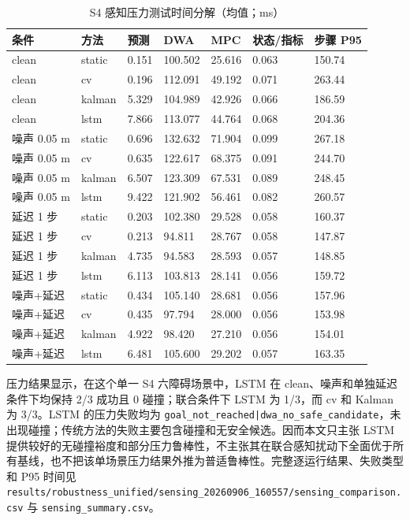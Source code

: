 \documentclass[10pt,a4paper,twocolumn]{ctexart}
\begin{document}
\begin{table}[t]
\centering
\small
\caption{S4 感知压力测试时间分解（均值；ms）}
\label{tab:table-8}
\begin{tabularx}{\textwidth}{YYYYYYY}
\toprule
条件 & 方法 & 预测 & DWA & MPC & 状态/指标 & 步骤 P95 \\
\midrule
clean & static & 0.151 & 100.502 & 25.616 & 0.063 & 150.74 \\
clean & cv & 0.196 & 112.091 & 49.192 & 0.071 & 263.44 \\
clean & kalman & 5.329 & 104.989 & 42.926 & 0.066 & 186.59 \\
clean & lstm & 7.866 & 113.077 & 44.764 & 0.068 & 204.36 \\
噪声 0.05 m & static & 0.696 & 132.632 & 71.904 & 0.099 & 267.18 \\
噪声 0.05 m & cv & 0.635 & 122.617 & 68.375 & 0.091 & 244.70 \\
噪声 0.05 m & kalman & 6.507 & 123.309 & 67.531 & 0.089 & 248.45 \\
噪声 0.05 m & lstm & 9.422 & 121.902 & 56.461 & 0.082 & 260.57 \\
延迟 1 步 & static & 0.203 & 102.380 & 29.528 & 0.058 & 160.37 \\
延迟 1 步 & cv & 0.213 & 94.811 & 28.767 & 0.058 & 147.87 \\
延迟 1 步 & kalman & 4.735 & 94.583 & 28.593 & 0.057 & 148.85 \\
延迟 1 步 & lstm & 6.113 & 103.813 & 28.141 & 0.056 & 159.72 \\
噪声+延迟 & static & 0.434 & 105.140 & 28.681 & 0.056 & 157.96 \\
噪声+延迟 & cv & 0.435 & 97.794 & 28.000 & 0.056 & 153.98 \\
噪声+延迟 & kalman & 4.922 & 98.420 & 27.210 & 0.056 & 154.01 \\
噪声+延迟 & lstm & 6.481 & 105.600 & 29.202 & 0.057 & 163.35 \\
\bottomrule
\end{tabularx}
\end{table}

压力结果显示，在这个单一 S4 六障碍场景中，LSTM 在 clean、噪声和单独延迟条件下均保持 2/3 成功且 0 碰撞；联合条件下 LSTM 为 1/3，而 cv 和 Kalman 为 3/3。LSTM 的压力失败均为 \texttt{goal\_not\_reached|dwa\_no\_safe\_candidate}，未出现碰撞；传统方法的失败主要包含碰撞和无安全候选。因而本文只主张 LSTM 提供较好的无碰撞裕度和部分压力鲁棒性，不主张其在联合感知扰动下全面优于所有基线，也不把该单场景压力结果外推为普适鲁棒性。完整逐运行结果、失败类型和 P95 时间见 \texttt{results/robustness\_unified/sensing\_20260906\_160557/sensing\_comparison.csv} 与 \texttt{sensing\_summary.csv}。
\end{document}
